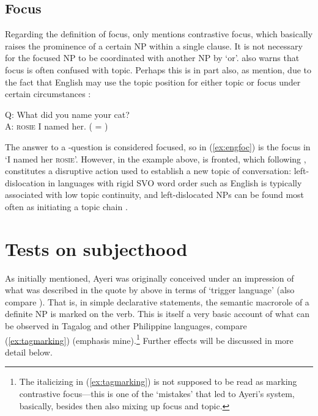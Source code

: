 \subsection{Focus}
\label{subsec:focus}

Regarding the definition of focus, \citet[174]{dixon2010a} only mentions
contrastive focus, which basically raises the prominence of a certain NP within
a single clause. It is not necessary for the focused NP to be coordinated with
another NP by `or'. \citet{dixon2010a} also warns that focus is often confused
with topic. Perhaps this is in part also, as \citet{bresnan2016} mention, due
to the fact that English may use the topic position for either topic or focus
under certain circumstances
\parencite[98]{bresnan2016}:

\ex\label{ex:engfoc}%
Q: What did you name your cat?\\
A: \textsc{rosie} I named her. ( = \Foc{})
\xe

The answer to a -question is considered focused, so  in
(\ref{ex:engfoc}) is the focus in `I named her \textsc{rosie}'. However, in the
example above,  is fronted, which following \citet{givon1983},
constitutes a disruptive action used to establish a new topic of conversation:
left-dislocation in languages with rigid SVO word order such as English is
typically associated with low topic continuity, and left-dislocated NPs can be
found most often as initiating a topic chain \citep[32]{givon1983}.


\section{Tests on subjecthood}
\label{subsec:subjecthood}

As initially mentioned, Ayeri was originally conceived under an impression of
what was described in the quote by \citet{cowan1995} above in terms of `trigger
language' (also compare \cite{schachter2015}). That is, in simple declarative
statements, the semantic macrorole of a definite NP is marked on the verb. This
is itself a very basic account of what can be observed in Tagalog and other
Philippine languages, compare (\ref{ex:tagmarking}) (emphasis
mine).\footnote{The italicizing in (\ref{ex:tagmarking}) is not supposed to be
read as marking contrastive focus---this is one of the `mistakes' that led to
Ayeri's system, basically, besides then also mixing up focus and topic.}
Further effects will be discussed in more detail below.

